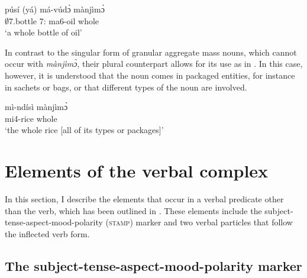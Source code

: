 \ea \label{wholeno}
\ex \label{wholeno3}
  \gll     púsí (yá) má-vúdɔ̀ mànjìmɔ̀\\
                $\emptyset$7.bottle {\db}7:{\ATT} ma6-oil whole \\
    \trans `a whole bottle of oil'
\z
\z

\noindent In contrast to the singular form of granular aggregate mass nouns, which cannot occur with {\itshape mànjìmɔ̀}, their plural counterpart allows for its use as in . In this case, however, it is understood that the noun comes in packaged entities, for instance in sachets or bags, or that different types of the noun are involved.

\ea \label{massPL}
  \gll     mì-ndísì mànjìmɔ̀ \\
                mi4-rice whole \\
    \trans `the whole rice [all of its types or packages]'
\z

























\section{Elements of the verbal complex}
\label{sec:VerbAd}

In this section, I describe the elements that occur in a verbal predicate other than the verb, which has been outlined in . These elements include the subject-tense-aspect-mood-polarity (\textsc{stamp}) marker and two verbal particles that follow the inflected verb form.



\subsection[The subject-tense-aspect-mood-polarity marker]{The subject-tense-aspect-mood-polarity marker}
\label{sec:SCOP}

